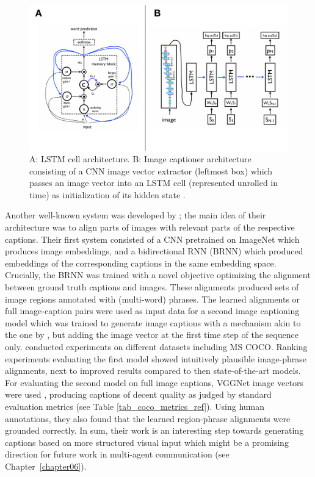 \begin{figure}
	\centering
	\includegraphics[width=\linewidth]{images/vinyals_lstm.pdf}
	\caption{A: LSTM cell architecture. B: Image captioner architecture consisting of a CNN image vector extractor (leftmost box) which passes an image vector into an LSTM cell (represented unrolled in time) as initialization of its hidden state \parencite[][p. 2--3, Fig.~2--3]{vinyals2015show}.}
	\label{fig:lstm}
\end{figure}

Another well-known system was developed by \cite{karpathy2015deep}; the main idea of their architecture was to align parts of images with relevant parts of the respective captions. 
Their first system consisted of a CNN pretrained on ImageNet which produces image embeddings, and a bidirectional RNN (BRNN) which produced embeddings of the corresponding captions in the same embedding space. Crucially, the BRNN was trained with a novel objective optimizing the alignment between ground truth captions and images. %
These alignments produced sets of image regions annotated with (multi-word) phrases.
The learned alignments or full image-caption pairs were used as input data for a second image captioning model which was trained to generate image captions with a mechanism akin to the one by \cite{vinyals2015show}, but adding the image vector at the first time step of the sequence only. \cite{karpathy2015deep} conducted experiments on different datasets including MS COCO. Ranking experiments evaluating the first model showed intuitively plausible image-phrase alignments, next to improved results compared to then state-of-the-art models. 
For evaluating the second model on full image captions, VGGNet image vectors were used \parencite{simonyan2014very}, producing captions of decent quality as judged by standard evaluation metrics (see Table \ref{tab_coco_metrics_ref}). Using human annotations, they also found that the learned region-phrase alignments were grounded correctly. %
In sum, their work is an interesting step towards generating captions based on more structured visual input which might be a promising direction for future work in multi-agent communication (see Chapter~\ref{chapter06}).

